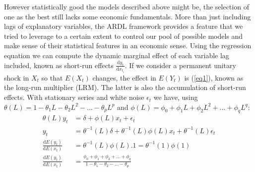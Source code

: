 However statistically good the models described above might be, the selection of one as the best still lacks some economic fundamentals. 
More than just including lags of explanatory variables, the ARDL framework provides a feature that we tried to leverage to a certain extent to control our pool of possible models and make sense of their statistical features in an economic sense. 
Using the regression equation we can compute the dynamic marginal effect of each variable lag included, known as short-run effects $\frac{\mathrm{d}y_{t}}{\mathrm{d}x_{t_{i}}}$. 
If we consider a permanent unitary shock in $X_{t}$ so that $E(X_{t})$ changes, the effect in $E(Y_{t})$ is (\ref{eq1}), known as the long-run multiplier (LRM). The latter is also the accumulation of short-run effects. 
With stationary series and white noise $\epsilon_{t}$ we have, using $\theta (L) = 1 - \theta_{1}L - \theta_{2}L^{2} - \dots - \theta_{p}L^{p}$ and $\phi (L) = \phi_{0} + \phi_{1}L + \phi_{2}L^{2} + \dots + \phi_{q}L^{q}$:
\vspace{-0.3cm}
\begin{align}
    \theta (L)y_{t} &= \delta + \phi (L)x_{t} + \epsilon_{t} \nonumber \\
    y_{t} &= \theta^{-1} (L)\delta + \theta^{-1} (L)\phi (L)x_{t} + \theta^{-1} (L)\epsilon_{t} \nonumber \\
    \frac{\mathrm{d}E(y_{t})}{\mathrm{d}E(x_{t})} &= \theta^{-1} (L)\phi (L).1 = \theta^{-1} (1)\phi (1) \nonumber\\
    \frac{\mathrm{d}E(y_{t})}{\mathrm{d}E(x_{t})} &= \frac{\phi_{0} + \phi_{1} + \phi_{2} + \dots + \phi_{q}}{1 - \theta_{1} - \theta_{2} - \dots - \theta_{p}} \label{eq1}
\end{align}

